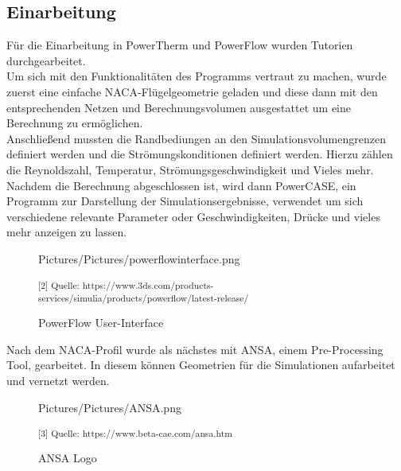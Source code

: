\subsection{Einarbeitung}
\label{Einarbeitung}

Für die Einarbeitung in PowerTherm und PowerFlow wurden Tutorien durchgearbeitet.\\
Um sich mit den Funktionalitäten des Programms vertraut zu machen, wurde zuerst eine einfache NACA-Flügelgeometrie geladen und diese dann mit den entsprechenden Netzen und Berechnungsvolumen ausgestattet um eine Berechnung zu ermöglichen. \\
Anschließend mussten die Randbediungen an den Simulationsvolumengrenzen definiert werden und die Strömungskonditionen definiert werden. Hierzu zählen die Reynoldszahl, Temperatur, Strömungsgeschwindigkeit und Vieles mehr.\\

Nachdem die Berechnung abgeschlossen ist, wird dann PowerCASE, ein Programm zur Darstellung der Simulationsergebnisse, verwendet um sich verschiedene relevante Parameter oder Geschwindigkeiten, Drücke und vieles mehr anzeigen zu lassen. 

\begin{figure}[H]
	\begin{center}
		\begin{overpic}[width=\linewidth]{Pictures/Pictures/powerflowinterface.png}
			
		\end{overpic}
	
	\caption{PowerFlow User-Interface}
	
	\small\textsuperscript{[2] Quelle: https://www.3ds.com/products-services/simulia/products/powerflow/latest-release/}
	\label{PowerFlowUI}
	\end{center}
\end{figure}

Nach dem NACA-Profil wurde als nächstes mit ANSA, einem Pre-Processing Tool, gearbeitet. In diesem können Geometrien für die Simulationen aufarbeitet und vernetzt werden. \\

\begin{figure}[H]
	\begin{center}
		\begin{overpic}[width=\linewidth]{Pictures/Pictures/ANSA.png}
			
		\end{overpic}
	
	\caption{ANSA Logo}
	
	\small\textsuperscript{[3] Quelle: https://www.beta-cae.com/ansa.htm}
	\label{ansa}
	\end{center}
\end{figure}

